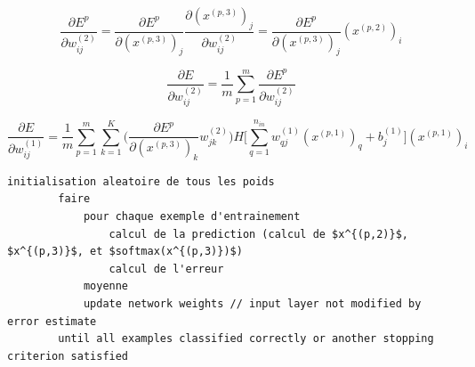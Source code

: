 \documentclass[a4paper,11pt,oneside,roman]{article}
\begin{document}
    \begin{equation}
        \frac{\partial E^p}{\partial w_{ij}^{(2)}} = \frac{\partial E^p}{\partial (x^{(p,3)})_{j}} \frac{\partial (x^{(p,3)})_{j}}{\partial w_{ij}^{(2)}} = \frac{\partial E^p}{\partial (x^{(p,3)})_{j}} (x^{(p,2)})_i
    \end{equation}

    \begin{equation}
        \frac{\partial E}{\partial w_{ij}^{(2)}} = \frac{1}{m} \sum\limits_{p=1}^{m} \frac{\partial E^p}{\partial w_{ij}^{(2)}}
    \end{equation}

    \begin{equation}
        \frac{\partial E}{\partial w_{ij}^{(1)}} = \frac{1}{m}\sum\limits_{p=1}^{m}\sum\limits_{k=1}^{K} \Big(\frac{\partial E^p}{\partial (x^{(p,3)})_k} w_{jk}^{(2)}\Big) H\big[\sum\limits_{q=1}^{n_{in}} w_{qj}^{(1)}(x^{(p,1)})_{q} + b_j^{(1)}\big] (x^{(p,1)})_i
    \end{equation}

    \begin{lstlisting}[mathescape]
        initialisation aleatoire de tous les poids
        faire
            pour chaque exemple d'entrainement
                calcul de la prediction (calcul de $x^{(p,2)}$, $x^{(p,3)}$, et $softmax(x^{(p,3)})$)
                calcul de l'erreur
            moyenne
            update network weights // input layer not modified by error estimate
        until all examples classified correctly or another stopping criterion satisfied
    \end{lstlisting}

    
\end{document}
